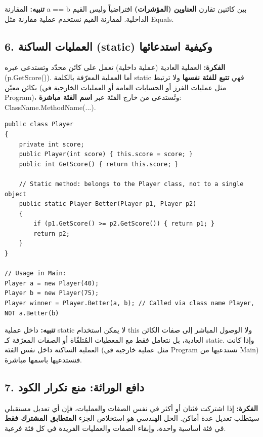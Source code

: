 \documentclass[14pt]{extarticle}
\begin{document}
\textbf{تنبيه:} المقارنة \textenglish{a == b} بين كائنين تقارن \textbf{العناوين (المؤشرات)} افتراضياً وليس القيم الداخلية. لمقارنة القيم نستخدم عملية مقارنة مثل \textenglish{Equals}.

\filbreak
\subsection*{6. العمليات الساكنة (\textenglish{static}) وكيفية استدعائها}
\textbf{الفكرة:} العملية العادية (عملية داخلية) تعمل على كائن محدّد وتستدعى عبره (\textenglish{p.GetScore()}). أما العملية المعرّفة بالكلمة \textenglish{static} فهي \textbf{تتبع للفئة نفسها} ولا ترتبط بكائن معيّن (مثل عمليات الفرز أو الحسابات العامة أو العمليات الخارجية في \textenglish{Program})، وتُستدعى من خارج الفئة عبر \textbf{اسم الفئة مباشرة}: \textenglish{ClassName.MethodName(...)}.

\begin{boxCode}
\begin{english}
\begin{verbatim}
public class Player
{
    private int score;
    public Player(int score) { this.score = score; }
    public int GetScore() { return this.score; }

    // Static method: belongs to the Player class, not to a single object
    public static Player Better(Player p1, Player p2)
    {
        if (p1.GetScore() >= p2.GetScore()) { return p1; }
        return p2;
    }
}

// Usage in Main:
Player a = new Player(40);
Player b = new Player(75);
Player winner = Player.Better(a, b); // Called via class name Player, NOT a.Better(b)
\end{verbatim}
\end{english}
\end{boxCode}

\textbf{تنبيه:} داخل عملية \textenglish{static} لا يمكن استخدام \textenglish{this} ولا الوصول المباشر إلى صفات الكائن العادية، بل نتعامل فقط مع المعطيات المُتلقّاة أو الصفات المعرّفة كـ \textenglish{static}. وإذا كانت العملية الساكنة داخل نفس الفئة (مثل عملية خارجية في \textenglish{Program} نستدعيها من \textenglish{Main}) فنستدعيها باسمها مباشرة.

\filbreak
\subsection*{7. دافع الوراثة: منع تكرار الكود}
\textbf{الفكرة:} إذا اشتركت فئتان أو أكثر في نفس الصفات والعمليات، فإن أي تعديل مستقبلي سيتطلب تعديل عدة أماكن. الحل الهندسي هو استخلاص الجزء \textbf{المتطابق المشترك فقط} في فئة أساسية واحدة، وإبقاء الصفات والعمليات الفريدة في كل فئة فرعية.
\end{document}
